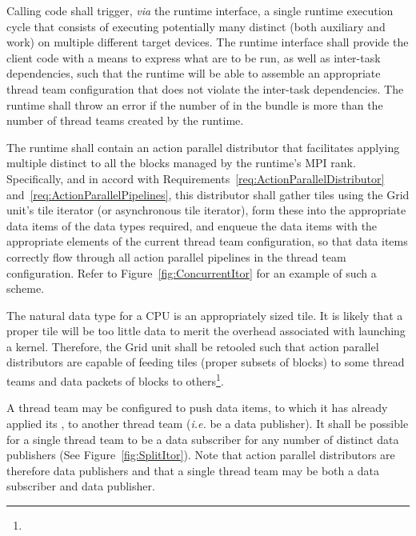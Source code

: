 \documentclass{article}
\begin{document}
\begin{req}
Calling code shall trigger, \textit{via} the runtime interface, a single runtime
execution cycle that consists of executing potentially many distinct \taskroutines (both
auxiliary and work) on multiple different target devices.  The runtime interface
shall provide the client code with a means to express what \taskroutines are to be run,
as well as inter-task dependencies, such that the runtime will be able to
assemble an appropriate thread team configuration that does not violate the
inter-task dependencies.  The runtime shall throw an error if the number of
\taskroutines in the bundle is more than the number of thread teams created by the
runtime.
\end{req}


\begin{req}
The runtime shall contain an action parallel distributor that facilitates
applying multiple distinct \taskroutines to all the blocks managed by the
runtime's MPI rank.  Specifically, and in accord with
Requirements~\ref{req:ActionParallelDistributor}
and~\ref{req:ActionParallelPipelines}, this distributor shall gather tiles using
the Grid unit's tile iterator (or asynchronous tile iterator), form these into
the appropriate data items of the data types required, and enqueue the data
items with the appropriate elements of the current thread team configuration, so
that data items correctly flow through all action parallel pipelines in the
thread team configuration.  Refer to Figure~\ref{fig:ConcurrentItor} for an
example of such a scheme.
\end{req}

\begin{req}
The natural data type for a CPU is an appropriately sized tile.  It is likely
that a proper tile will be too little data to merit the overhead associated
with launching a kernel.  Therefore, the Grid unit shall be retooled such that
action parallel distributors are capable of feeding tiles (proper subsets of blocks) to
some thread teams and data packets of blocks to
others\footnote{}.
\end{req}

\begin{req}
A thread team may be configured to push data items, to which it has already
applied its \taskroutine, to another thread team (\textit{i.e.} be a data publisher).
It shall be possible for a single thread
team to be a data subscriber for any number of distinct data
publishers (See Figure~\ref{fig:SplitItor}).  Note that action parallel
distributors are therefore data publishers and that a single thread team may be
both a data subscriber and data publisher.  
\end{req}
\end{document}
